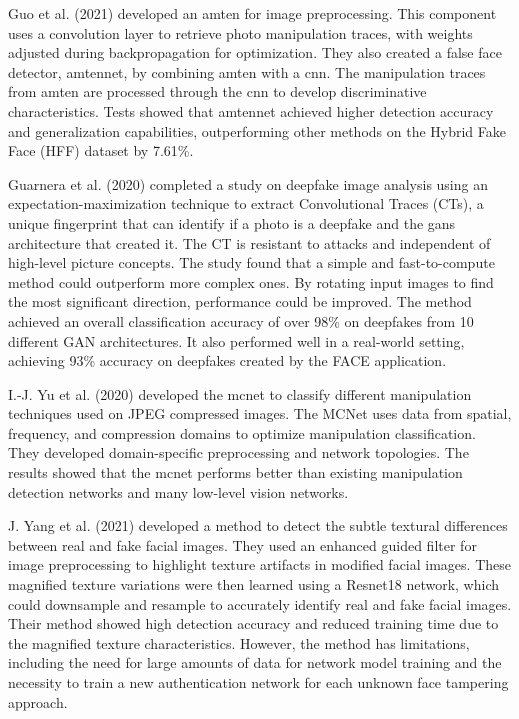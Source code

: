 Guo et al. (2021)\cite{guo2021fake} developed an \acrshort*{amten} for image preprocessing. This component uses a convolution layer to retrieve photo manipulation traces, with weights adjusted during backpropagation for optimization. They also created a false face detector, \acrshort{amten}net, by combining \acrshort{amten} with a \acrshort{cnn}. The manipulation traces from \acrshort{amten} are processed through the \acrshort{cnn} to develop discriminative characteristics. Tests showed that \acrshort{amten}net achieved higher detection accuracy and generalization capabilities, outperforming other methods on the Hybrid Fake Face (HFF) dataset by 7.61\%.

Guarnera et al. (2020)\cite{guarnera2020fighting} completed a study on deepfake image analysis using an expectation-maximization technique to extract Convolutional Traces (CTs), a unique fingerprint that can identify if a photo is a deepfake and the \acrshort{gans} architecture that created it. The CT is resistant to attacks and independent of high-level picture concepts. The study found that a simple and fast-to-compute method could outperform more complex ones. By rotating input images to find the most significant direction, performance could be improved. The method achieved an overall classification accuracy of over 98\% on deepfakes from 10 different GAN architectures. It also performed well in a real-world setting, achieving 93\% accuracy on deepfakes created by the FACE application.

I.-J. Yu et al. (2020)\cite{yu2020manipulation} developed the \acrfull{mcnet} to classify different manipulation techniques used on JPEG compressed images. The MCNet uses data from spatial, frequency, and compression domains to optimize manipulation classification. They developed domain-specific preprocessing and network topologies. The results showed that the \acrshort{mcnet} performs better than existing manipulation detection networks and many low-level vision networks.

J. Yang et al. (2021)\cite{yang2021detecting} developed a method to detect the subtle textural differences between real and fake facial images. They used an enhanced guided filter for image preprocessing to highlight texture artifacts in modified facial images. These magnified texture variations were then learned using a Resnet18 network, which could downsample and resample to accurately identify real and fake facial images. Their method showed high detection accuracy and reduced training time due to the magnified texture characteristics. However, the method has limitations, including the need for large amounts of data for network model training and the necessity to train a new authentication network for each unknown face tampering approach.

